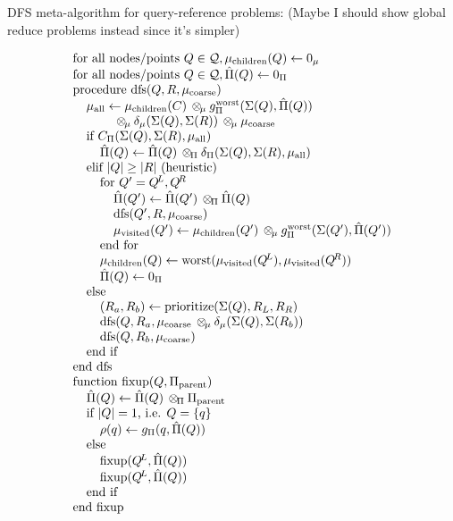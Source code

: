 \documentclass[times, 10pt,twocolumn]{article}
\DeclareMathOperator*{\worst}{worst}
\DeclareMathOperator{\dfs}{dfs}
\newcommand{\wholeQ}{\mathcal{Q}}
\newcommand{\x}{\hspace{0.15in}}
\newcommand{\xx}{\hspace{0.3in}}
\newcommand{\xxx}{\hspace{0.45in}}
\newcommand{\kdleft}[1]{#1^{\!L}}
\newcommand{\kdright}[1]{#1^{\!R}}
\newcommand{\myop}[1]{{\scriptstyle\:}\otimes_{\!#1}}
\newcommand{\outpi}{\Pi}
\newcommand{\oppi}{\myop{\outpi}}
\newcommand{\gpi}{g_{\outpi}}
\newcommand{\canprunepi}{C_{\outpi}}
\newcommand{\deltapi}{\delta_{\outpi}}
\newcommand{\gpiworst}{g_{\outpi}^{\worst}}
\newcommand{\outrho}{\rho}
\newcommand{\inmu}{\mu}
\newcommand{\opmu}{\myop{\mu}}
\newcommand{\deltamu}{\delta_{\mu}}
\newcommand{\muparent}{\inmu_{\text{coarse}}}
\newcommand{\muchild}{\inmu_{\text{children}}}
\newcommand{\muvisit}{\inmu_{\text{visited}}}
\newcommand{\muall}{\inmu_{\text{all}}}
\newcommand{\hatpi}{\hat{\outpi}}
\newcommand{\piparent}{\outpi_{\text{parent}}}
\newcommand{\outstat}{\Sigma}
\begin{document}
DFS meta-algorithm for query-reference problems:
(Maybe I should show global reduce problems instead since it's simpler)

\begin{equation*}
  \begin{array}{l}
    \text{for all nodes/points } Q \in \wholeQ, \muchild(Q) \gets 0_{\inmu}
    \\
    \text{for all nodes/points } Q \in \wholeQ, \hatpi(Q) \gets 0_{\outpi}
    \\
    \mbox{procedure dfs}(Q, R, \muparent)
    \\
    \x \muall \gets \muchild(C) \opmu \gpiworst(\outstat(Q), \hatpi(Q))
    \\ \x \qquad \opmu \deltamu(\outstat(Q), \outstat(R)) \opmu \muparent
    \\
    \x \text{if } \canprunepi(\outstat(Q), \outstat(R), \muall)
    \\
    \xx \hatpi(Q) \gets \hatpi(Q) \oppi \deltapi(\outstat(Q), \outstat(R), \muall)
    \\
    \x \text{elif } |Q| \geq |R| \text{ (heuristic)}
    \\
    \xx \text{for } Q' = \kdleft{Q}, \kdright{Q}
    \\
    \xxx \hatpi(Q') \gets \hatpi(Q') \oppi \hatpi(Q)
    \\
    \xxx \text{dfs}(Q', R, \muparent)
    \\
    \xxx \muvisit(Q') \gets \muchild(Q') \opmu \gpiworst(\outstat(Q'), \hatpi(Q'))
    \\
    \xx \text{end for}
    \\
    \xx \muchild(Q) \gets \worst(\muvisit(\kdleft{Q}), \muvisit(\kdright{Q}))
    \\
    \xx \hatpi(Q) \gets 0_{\outpi}
    \\
    \x \mbox{else}
    \\
    \xx (R_a, R_b) \gets \mbox{prioritize}(\outstat(Q), R_L, R_R)
    \\
    \xx \dfs(Q, R_a, \muparent \opmu \deltamu(\outstat(Q), \outstat(R_b))
    \\
    \xx \dfs(Q, R_b, \muparent)
    \\
    \x \text{end if}
    \\
    \text{end dfs}
    \\
    \text{function fixup}(Q, \piparent)
    \\
    \x \hatpi(Q) \gets \hatpi(Q) \oppi \piparent
    \\
    \x \text{if } |Q| = 1 \text{, i.e. } Q = \{q\}
    \\
    \xx \outrho(q) \gets \gpi(q, \hatpi(Q))
    \\
    \x \text{else}
    \\
    \xx \text{fixup}(\kdleft{Q}, \hatpi(Q))
    \\
    \xx \text{fixup}(\kdleft{Q}, \hatpi(Q))
    \\
    \x \mbox{end if}
    \\
    \mbox{end fixup}
  \end{array}
\end{equation*}
\end{document}
